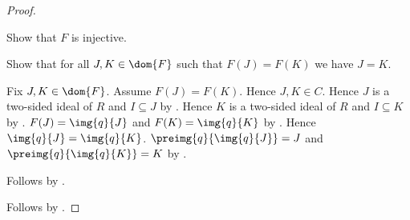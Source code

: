 \begin{proof}
\begin{subproof}
    \end{subproof}
    Show that $F$ is injective.
    \begin{subproof}
        Show that for all $J,K\in\dom{F}$ such that $F(J)=F(K)$
            we have $J=K$.
        \begin{subproof}
            Fix $J,K\in\dom{F}$.
            Assume $F(J)=F(K)$.
            Hence $J,K\in C$.
            Hence $J$ is a two-sided ideal of $R$ and
                $I\subseteq J$ by \auto.
            Hence $K$ is a two-sided ideal of $R$ and
                $I\subseteq K$ by \auto.
            $F(J)=\img{q}{J}$ and $F(K)=\img{q}{K}$ by
                .
            Hence $\img{q}{J}=\img{q}{K}$.
            $\preimg{q}{\img{q}{J}}=J$ and
                $\preimg{q}{\img{q}{K}}=K$ by
                .
        \end{subproof}
        Follows by .
    \end{subproof}
    Follows by .
\end{proof}


